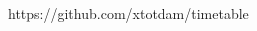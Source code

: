 \documentclass[12pt,landscape]{report}
\begin{document}
\begin{tabular}{@{}|c!{\vrule width 1.25pt}c|c|c|c|c|c|@{}}
\\ \hline
%
 &

\ppps{~} &                                                                  %
\ppps{~} &                                                                  %
\ppps{~} &                                                                  %
\ppps{~} &                                                                  %
\ppps{~} &                                                                  %
\ppps{~}                                                                    %

\\ \hline

\end{tabular}

\vfill\hfill{\color{gray!50}\scriptsize https://github.com/xtotdam/timetable}
\end{document}
